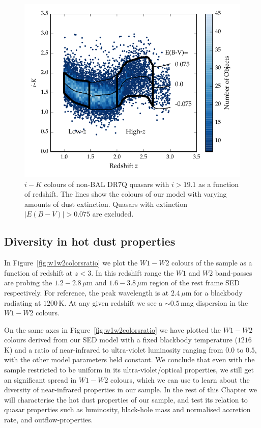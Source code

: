 \begin{figure}
  \centering
  \includegraphics[width=\columnwidth]{figures/chapter05/ik_versus_z_low_ext.pdf}
  \caption[{$i-K$ colours of non-BAL DR7Q quasars with $i>19.1$ as a function of redshift.}]{$i-K$ colours of non-BAL DR$7$Q quasars with $i>19.1$ as a function of redshift. The lines show the colours of our model with varying amounts of dust extinction. Quasars with extinction $|E(B-V)|>0.075$ are excluded.}
  \label{fig:ikzplot}
\end{figure}

\subsection{Diversity in hot dust properties}

In Figure~\ref{fig:w1w2colorsratio} we plot the $W1 - W2$ colours of the sample as a function of redshift at $z<3$. 
In this redshift range the $W1$ and $W2$ band-passes are probing the $1.2 - 2.8$\,$\mu$m and $1.6 - 3.8$\,$\mu$m region of the rest frame SED respectively. 
For reference, the peak wavelength is at $2.4$\,$\mu$m for a blackbody radiating at $1200$\,K. 
At any given redshift we see a $\sim 0.5$\,mag dispersion in the $W1-W2$ colours. 

On the same axes in Figure~\ref{fig:w1w2colorsratio} we have plotted the $W1-W2$ colours derived from our SED model with a fixed blackbody temperature ($1216$\,K) and a ratio of near-infrared to ultra-violet luminosity ranging from $0.0$ to $0.5$, with the other model parameters held constant. 
We conclude that even with the sample restricted to be uniform in its ultra-violet/optical properties, we still get an significant spread in $W1-W2$ colours, which we can use to learn about the diversity of near-infrared properties in our sample. 
In the rest of this Chapter we will characterise the hot dust properties of our sample, and test its relation to quasar properties such as luminosity, black-hole mass and normalised accretion rate, and outflow-properties. 

